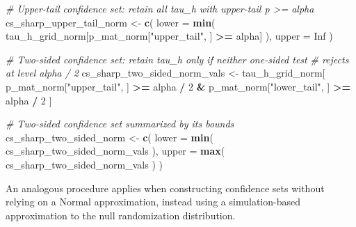 \documentclass[
  12pt,
  leqno]{article}
\newenvironment{Shaded}{\begin{snugshade}}{\end{snugshade}}
\newcommand{\AttributeTok}[1]{\textcolor[rgb]{0.13,0.29,0.53}{#1}}
\newcommand{\CommentTok}[1]{\textcolor[rgb]{0.56,0.35,0.01}{\textit{#1}}}
\newcommand{\ConstantTok}[1]{\textcolor[rgb]{0.56,0.35,0.01}{#1}}
\newcommand{\DecValTok}[1]{\textcolor[rgb]{0.00,0.00,0.81}{#1}}
\newcommand{\FunctionTok}[1]{\textcolor[rgb]{0.13,0.29,0.53}{\textbf{#1}}}
\newcommand{\NormalTok}[1]{#1}
\newcommand{\OtherTok}[1]{\textcolor[rgb]{0.56,0.35,0.01}{#1}}
\newcommand{\SpecialCharTok}[1]{\textcolor[rgb]{0.81,0.36,0.00}{\textbf{#1}}}
\newcommand{\StringTok}[1]{\textcolor[rgb]{0.31,0.60,0.02}{#1}}
\begin{document}
\begin{Shaded}
\begin{Highlighting}[]
\CommentTok{\# Upper{-}tail confidence set: retain all tau\_h with upper{-}tail p \textgreater{}= alpha}
\NormalTok{cs\_sharp\_upper\_tail\_norm }\OtherTok{\textless{}{-}} \FunctionTok{c}\NormalTok{(}
  \AttributeTok{lower =} \FunctionTok{min}\NormalTok{(}
\NormalTok{    tau\_h\_grid\_norm[p\_mat\_norm[}\StringTok{"upper\_tail"}\NormalTok{, ] }\SpecialCharTok{\textgreater{}=}\NormalTok{ alpha]}
\NormalTok{  ),}
  \AttributeTok{upper =} \ConstantTok{Inf}
\NormalTok{)}

\CommentTok{\# Two{-}sided confidence set: retain tau\_h only if neither one{-}sided test}
\CommentTok{\# rejects at level alpha / 2}
\NormalTok{cs\_sharp\_two\_sided\_norm\_vals }\OtherTok{\textless{}{-}}\NormalTok{ tau\_h\_grid\_norm[}
\NormalTok{  p\_mat\_norm[}\StringTok{"upper\_tail"}\NormalTok{, ] }\SpecialCharTok{\textgreater{}=}\NormalTok{ alpha }\SpecialCharTok{/} \DecValTok{2} \SpecialCharTok{\&}
\NormalTok{    p\_mat\_norm[}\StringTok{"lower\_tail"}\NormalTok{, ] }\SpecialCharTok{\textgreater{}=}\NormalTok{ alpha }\SpecialCharTok{/} \DecValTok{2}
\NormalTok{]}

\CommentTok{\# Two{-}sided confidence set summarized by its bounds}
\NormalTok{cs\_sharp\_two\_sided\_norm }\OtherTok{\textless{}{-}} \FunctionTok{c}\NormalTok{(}
  \AttributeTok{lower =} \FunctionTok{min}\NormalTok{(}
\NormalTok{    cs\_sharp\_two\_sided\_norm\_vals}
\NormalTok{  ),}
  \AttributeTok{upper =} \FunctionTok{max}\NormalTok{(}
\NormalTok{    cs\_sharp\_two\_sided\_norm\_vals}
\NormalTok{  )}
\NormalTok{)}
\end{Highlighting}
\end{Shaded}

\doublespacing

An analogous procedure applies when constructing confidence sets without
relying on a Normal approximation, instead using a simulation-based
approximation to the null randomization distribution.

\singlespacing
\end{document}
